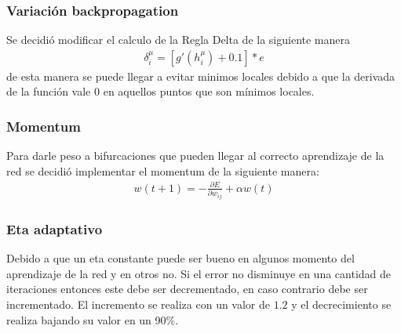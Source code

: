 \documentclass[11pt]{article}
\begin{document}
    \subsubsection{Variación backpropagation}
    \par Se decidió modificar el calculo de la Regla Delta de la siguiente manera \begin{eqnarray} \label{eq:solve} \delta_{i}^{\mu} = [g'(h_{i}^{\mu})+0.1]*e \end{eqnarray} de esta manera se puede llegar a evitar minimos locales debido a que la derivada de la función vale 0 en aquellos puntos que son mínimos locales.
    \subsubsection{Momentum}
    \par Para darle peso a bifurcaciones que pueden llegar al correcto aprendizaje de la red se decidió implementar el momentum de la siguiente manera: \begin{eqnarray} \label{eq:solve} w(t+1) = -\frac{\partial E}{\partial w_{ij}} + \alpha w(t) \end{eqnarray}
    \subsubsection{Eta adaptativo}
    \par Debido a que un eta constante puede ser bueno en algunos momento del aprendizaje de la red y en otros no. Si el error no disminuye en una cantidad de iteraciones entonces este debe ser decrementado, en caso contrario debe ser incrementado. El incremento se realiza con un valor de $1.2$ y el decrecimiento se realiza bajando su valor en un 90\%.
\end{document}
